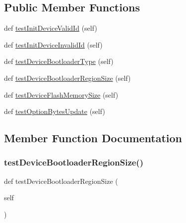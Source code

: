 \subsection*{Public Member Functions}
\begin{DoxyCompactItemize}
\item 
def \hyperlink{classstm__tools_1_1tests_1_1devicetype__test_1_1DeviceTypeTestCase_a44235804fcdd3742539311a5b227cd65}{test\+Init\+Device\+Valid\+Id} (self)
\item 
def \hyperlink{classstm__tools_1_1tests_1_1devicetype__test_1_1DeviceTypeTestCase_a34ba45e3d34c504190cfdda52c974106}{test\+Init\+Device\+Invalid\+Id} (self)
\item 
def \hyperlink{classstm__tools_1_1tests_1_1devicetype__test_1_1DeviceTypeTestCase_a4fb9c46c063bdb33ee776b5bfaed520c}{test\+Device\+Bootloader\+Type} (self)
\item 
def \hyperlink{classstm__tools_1_1tests_1_1devicetype__test_1_1DeviceTypeTestCase_aeea2f380b7d7106f7828562b2582c2c1}{test\+Device\+Bootloader\+Region\+Size} (self)
\item 
def \hyperlink{classstm__tools_1_1tests_1_1devicetype__test_1_1DeviceTypeTestCase_a02d45ddc1e867ec1642eec0a5803e540}{test\+Device\+Flash\+Memory\+Size} (self)
\item 
def \hyperlink{classstm__tools_1_1tests_1_1devicetype__test_1_1DeviceTypeTestCase_aac994f12a19d50c45d0e86e833c62f10}{test\+Option\+Bytes\+Update} (self)
\end{DoxyCompactItemize}


\subsection{Member Function Documentation}
\mbox{\label{classstm__tools_1_1tests_1_1devicetype__test_1_1DeviceTypeTestCase_aeea2f380b7d7106f7828562b2582c2c1}} 
\subsubsection{\texorpdfstring{test\+Device\+Bootloader\+Region\+Size()}{testDeviceBootloaderRegionSize()}}
{\footnotesize\ttfamily def test\+Device\+Bootloader\+Region\+Size (\begin{DoxyParamCaption}\item[{}]{self }\end{DoxyParamCaption})}

